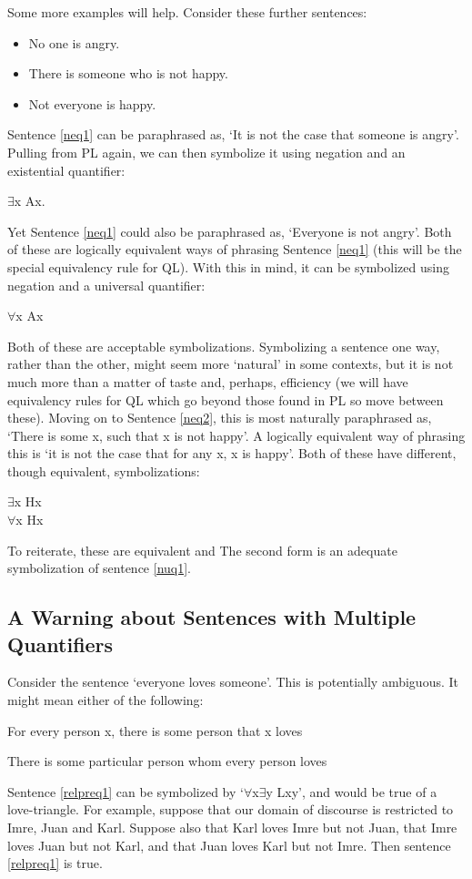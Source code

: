 Some more examples will help. Consider these further sentences:
\begin{itemize}
\item[\ex{neq1}] No one is angry.
\item[\ex{neq2}] There is someone who is not happy.
\item[\ex{nuq1}] Not everyone is happy.
\end{itemize}
Sentence \ref{neq1} can be paraphrased as, ‘It is not the case that someone is angry’. Pulling from PL again, we can then symbolize it using negation and an existential quantifier:
\begin{center}
\enot $\exists$x Ax.
\end{center}
Yet Sentence \ref{neq1} could also be paraphrased as, ‘Everyone is not angry’. Both of these are logically equivalent ways of phrasing Sentence \ref{neq1} (this will be the special equivalency rule for QL). With this in mind, it can be symbolized using negation and a universal quantifier:
\begin{center}
$\forall$x \enot Ax
\end{center}
Both of these are acceptable symbolizations. Symbolizing a sentence one way, rather than the other, might seem more ‘natural’ in some contexts, but it is not much more than a matter of taste and, perhaps, efficiency (we will have equivalency rules for QL which go beyond those found in PL so move between these). Moving on to Sentence \ref{neq2}, this is most naturally paraphrased as, ‘There is some x, such that x is not happy’. A logically equivalent way of phrasing this is ‘it is not the case that for any x, x is happy'. Both of these have different, though equivalent, symbolizations:
\begin{center}
$\exists$x \enot Hx\\
\enot $\forall$x Hx
\end{center}
To reiterate, these are equivalent and The second form is an adequate symbolization of sentence \ref{nuq1}.

\subsection{A Warning about Sentences with Multiple Quantifiers}

Consider the sentence ‘everyone loves someone’. This is potentially ambiguous. It might mean either of the following:
\begin{earg}
\item[\ex{relpreq1}]For every person x, there is some person that x loves
\item[\ex{relpreq2}]There is some particular person whom every person loves
\end{earg}
Sentence \ref{relpreq1} can be symbolized by ‘$\forall$x$\exists$y Lxy’, and would be true of a love-triangle. For example, suppose that our domain of discourse is restricted to Imre, Juan and Karl. Suppose also that Karl loves Imre but not Juan, that Imre loves Juan but not Karl, and that Juan loves Karl but not Imre. Then sentence \ref{relpreq1} is true.

